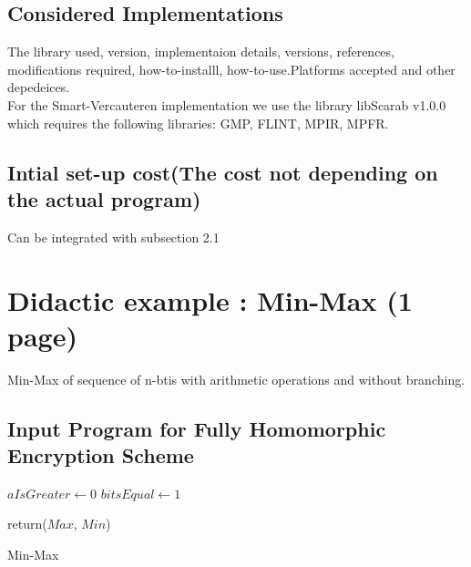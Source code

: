 \documentclass{acm_proc_article-sp}
\begin{document}
\subsection{Considered Implementations}

The library used, version, implementaion details, versions, references, modifications required, how-to-installl, how-to-use.Platforms accepted and other depedeices.\\
For the Smart-Vercauteren implementation we use the library libScarab v1.0.0 which requires the following libraries: GMP, FLINT, MPIR, MPFR.
\subsection{Intial set-up cost(The cost not depending on the actual program)}

Can be integrated with subsection 2.1 

\section{ Didactic example :  Min-Max (1 page)}
Min-Max of sequence of n-btis with arithmetic operations and without branching.
\subsection{Input Program for Fully Homomorphic Encryption Scheme}



\linesnumbered

\begin{algorithm}[H]

\SetVline



 $aIsGreater \leftarrow 0$\;
 $bitsEqual \leftarrow 1$\;
	




return($Max$, $Min$)

 \caption{Min-Max\label{Code:algo}}

\end{algorithm}
\end{document}
